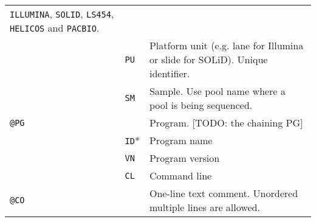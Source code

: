\documentclass[10pt]{article}
\begin{document}
\begin{center}
\begin{tabular}{|l|l|p{13.5cm}|}
  {\tt ILLUMINA}, {\tt SOLID}, {\tt LS454}, {\tt HELICOS} and {\tt PACBIO}.\\\cline{2-3}
  & {\tt PU} & Platform unit (e.g. lane for Illumina or slide for SOLiD). Unique identifier.\\\cline{2-3}
  & {\tt SM} & Sample. Use pool name where a pool is being sequenced.\\\hline
  \multicolumn{2}{|l}{\tt @PG} & Program. [TODO: the chaining PG] \\\cline{2-3}
  & {\tt ID}* & Program name \\\cline{2-3}
  & {\tt VN} & Program version \\\cline{2-3}
  & {\tt CL} & Command line \\\hline
  \multicolumn{2}{|l}{\tt @CO} & One-line text comment. Unordered multiple lines are allowed.\\
  \hline
\end{tabular}
\end{center}
\end{document}

